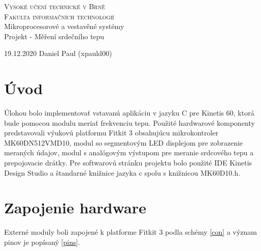 \documentclass[11pt,a4paper]{article}
\begin{document}
	\begin{titlepage}

		\begin{center}

			 \textsc{\Huge {Vysoké učení technické v Brně}} \\
			\textsc{\huge {Fakulta informačních technologií}}\\
			{\LARGE Mikroprocesorové a vestavěné systémy} \\ [0.15 cm]
			{\Huge Projekt - Měření srdečního tepu}\\ 	
		\end{center}

	{\Large 19.12.2020 \hspace{90mm} Daniel Paul (xpauld00)}		

	\end{titlepage}
	
	
	\section{Úvod}
	Úlohou bolo implementovať vstavanú aplikáciu v jazyku C pre Kinetis 60, ktorá bude pomocou modulu meriať frekvenciu tepu.
	Použité hardwarové komponenty predstavovali výukovú platformu Fitkit 3 obsahujúcu mikrokontroler MK60DN512VMD10, modul so segmentovým LED displejom pre zobrazenie meraných údajov, modul s analógovým výstupom pre meranie srdcového tepu a prepojovacie drátky. Pre softwarovú stránku projektu bolo použité IDE Kinetis Design Studio a štandarné knižnice jazyka c spolu s knižnicou MK60D10.h.
	\section{Zapojenie hardware}
	Externé moduly boli zapojené k platforme Fitkit 3 podla schémy \ref{con} a význam pinov je popísaný \ref{pins}.
\end{document}
